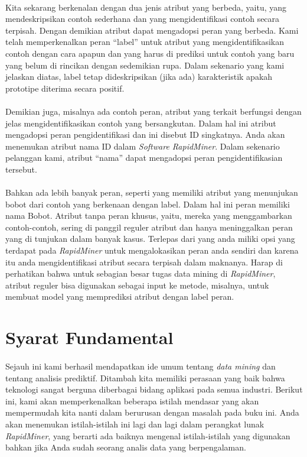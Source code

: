 \paragraph{} Kita sekarang  berkenalan dengan dua jenis atribut yang berbeda, yaitu, yang mendeskripsikan contoh sederhana dan yang mengidentifikasi contoh secara terpisah. Dengan demikian atribut dapat mengadopsi peran yang berbeda. Kami telah memperkenalkan peran “label” untuk atribut yang mengidentifikasikan contoh dengan cara apapun dan yang harus di prediksi untuk contoh yang baru yang belum di rincikan dengan sedemikian rupa. Dalam sekenario yang kami jelaskan diatas, label tetap dideskripsikan (jika ada) karakteristik apakah prototipe diterima secara positif.

\paragraph{}Demikian juga, misalnya ada contoh peran, atribut yang terkait berfungsi dengan jelas mengidentifikasikan contoh yang bersangkutan. Dalam hal ini atribut mengadopsi peran  pengidentifikasi dan ini disebut ID singkatnya. Anda akan menemukan atribut nama ID dalam\textit{ Software RapidMiner}.  Dalam  sekenario pelanggan kami, atribut “nama” dapat mengadopsi peran pengidentifikasian tersebut. 

\paragraph{} Bahkan ada lebih banyak peran, seperti yang memiliki atribut yang menunjukan bobot dari contoh yang berkenaan dengan label. Dalam hal ini peran memiliki nama Bobot. Atribut tanpa peran khusus, yaitu, mereka yang menggambarkan contoh-contoh, sering di panggil reguler atribut dan hanya meninggalkan peran yang di tunjukan dalam banyak kasus. Terlepas dari yang anda miliki opsi yang terdapat pada \textit{RapidMiner} untuk mengalokasikan peran anda sendiri dan karena itu anda mengidentifikasi atribut secara terpisah dalam maknanya. Harap di perhatikan bahwa untuk sebagian besar tugas  data mining di \textit{RapidMiner}, atribut reguler bisa digunakan sebagai input ke metode, misalnya, untuk membuat model yang memprediksi atribut dengan label peran.

\section{Syarat Fundamental }
\paragraph{} Sejauh ini kami berhasil mendapatkan ide umum tentang \textit{data mining }dan tentang analisis prediktif. Ditambah kita memiliki perasaan yang baik bahwa teknologi sangat berguna diberbagai bidang aplikasi pada semua industri. Berikut ini, kami akan memperkenalkan beberapa istilah mendasar yang akan mempermudah kita nanti dalam berurusan dengan masalah pada buku ini. Anda akan menemukan istilah-istilah ini lagi dan lagi dalam perangkat lunak \textit{RapidMiner}, yang berarti ada baiknya mengenal istilah-istilah yang digunakan bahkan jika Anda sudah seorang analis data yang berpengalaman. 

